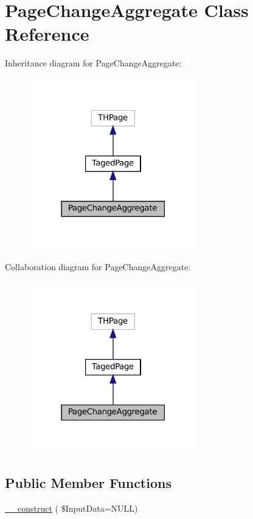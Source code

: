 \hypertarget{class_page_change_aggregate}{}\section{Page\+Change\+Aggregate Class Reference}
\label{class_page_change_aggregate}


Inheritance diagram for Page\+Change\+Aggregate\+:\nopagebreak
\begin{figure}[H]
\begin{center}
\leavevmode
\includegraphics[width=207pt]{class_page_change_aggregate__inherit__graph}
\end{center}
\end{figure}


Collaboration diagram for Page\+Change\+Aggregate\+:\nopagebreak
\begin{figure}[H]
\begin{center}
\leavevmode
\includegraphics[width=207pt]{class_page_change_aggregate__coll__graph}
\end{center}
\end{figure}
\subsection*{Public Member Functions}
\begin{DoxyCompactItemize}
\item 
\hyperlink{class_page_change_aggregate_a37b7538f25666dae026a11df00733b32}{\+\_\+\+\_\+construct} ( \$Input\+Data=N\+U\+LL)
\end{DoxyCompactItemize}
